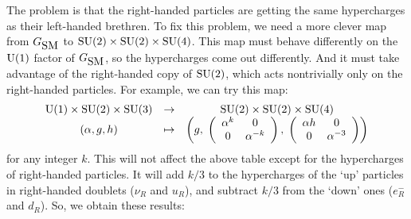 \documentclass{article}
\newcommand{\U}{{\rm U}}    %
\newcommand{\SU}{{\rm SU}}    %
\newcommand{\GSM}{{G_{\mbox{\rm SM}}}}  %
\begin{document}
The problem is that the right-handed particles are getting the
same hypercharges as their left-handed brethren.  
To fix this problem, we need a more clever map from 
$\GSM$ to $\SU(2) \times \SU(2) \times \SU(4)$.  This map must behave
differently on the $\U(1)$ factor of $\GSM$, so the hypercharges
come out differently.  And it must take advantage of the 
right-handed copy of $\SU(2)$, which acts nontrivially only on the
right-handed particles.  For example, we can try this map:
\[ \begin{array}{ccc}
\U(1) \times \SU(2) \times \SU(3) &\to& \SU(2) \times \SU(2) \times \SU(4) \\
  (\alpha, g, h)  &\mapsto&  
\left( g, \;
\left(
\begin{array}{c c}
	\alpha^k & 0 \\
	0 & \alpha^{-k}
\end{array}
\right), \;
\left(
\begin{array}{c c}
	\alpha h & 0 \\
	0 & \alpha^{-3}
\end{array}
\right) 
\right)
\end{array}
\]
for any integer $k$.  This will not affect the above table
except for the hypercharges of right-handed particles.  It will
add $k/3$ to the hypercharges of the `up' particles in right-handed
doublets ($\nu_R$ and $u_R$), and subtract $k/3$ from the `down'
ones ($e^-_R$ and $d_R$).  So, we obtain these results:
\end{document}
